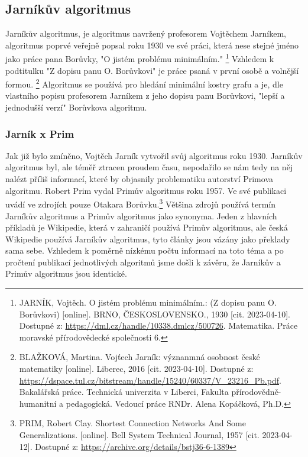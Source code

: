 \documentclass[11pt]{article}
\begin{document}
\subsection{Jarníkův algoritmus}
Jarníkův algoritmus, je algoritmus navržený profesorem Vojtěchem Jarníkem, algoritmus poprvé veřejně popsal roku 1930 ve své práci, která nese stejné jméno jako práce pana Borůvky, "O jistém problému minimálním."
\footnote{JARNÍK, Vojtěch. O jistém problému minimálním.: (Z dopisu panu O. Borůvkovi) [online]. BRNO, ČESKOSLOVENSKO., 1930 [cit. 2023-04-10]. Dostupné z: \url{https://dml.cz/handle/10338.dmlcz/500726}. Matematika. Práce moravské přírodovědecké společnosti 6.} Vzhledem k podtitulku "Z dopisu panu O. Borůvkovi" je práce psaná v první osobě a volnější formou.
\footnote{BLAŽKOVÁ, Martina. Vojťech Jarník: význanmná osobnost české matematiky [online]. Liberec, 2016 [cit. 2023-04-10]. Dostupné z: \url{https://dspace.tul.cz/bitstream/handle/15240/60337/V_23216_Pb.pdf}. Bakalářská práce. Technická univerzita v Liberci, Fakulta přírodovědně-humanitní a pedagogická. Vedoucí práce RNDr. Alena Kopáčková, Ph.D.} Algoritmus se používá pro hledání minimální kostry grafu a je, dle vlastního popisu profesorem Jarníkem z jeho dopisu panu Borůvkovi, "lepší a jednodušší verzí" Borůvkova algoritmu.

\subsubsection{Jarník x Prim}
Jak již bylo zmíněno, Vojtěch Jarník vytvořil svůj algoritmus roku 1930. Jarníkův algoritmus byl, ale téměř ztracen proudem času, nepodařilo se nám tedy na něj nalézt příliš informací, které by objasnily problematiku autorství Primova algoritmu. Robert Prim vydal Primův algoritmus roku 1957. Ve své publikaci uvádí ve zdrojích pouze Otakara Borůvku.\footnote{PRIM, Robert Clay. Shortest Connection Networks And Some Generalizations. [online]. Bell System Technical Journal, 1957 [cit. 2023-04-12]. Dostupné z: \url{https://archive.org/details/bstj36-6-1389}} Většina zdrojů používá termín Jarníkův algoritmus a Primův algoritmus jako synonyma. Jeden z hlavních příkladů je Wikipedie, která v zahraničí používá Primův algoritmus, ale česká Wikipedie používá Jarníkův algoritmus, tyto články jsou vázány jako překlady sama sebe. Vzhledem k poměrně nízkému počtu informací na toto téma a po pročtení publikací jednotlivých algoritmů jsme došli k závěru, že Jarníkův a Primův algoritmus jsou identické.
\end{document}
